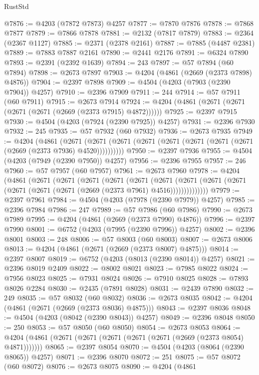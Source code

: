 \begin{lexlean}{RustStd}
\begin{coremodule}
@7876 := @4203 (@7872 @7873) @4257
@7877 := @7870 @7876
@7878 := @7868 @7877
@7879 := @7866 @7878
@7881 := @2132 (@7817 @7879)
@7883 := @2364 (@2367 @1127)
@7885 := @2371 (@2378 @2161)
@7887 := @7885 (@4487 @2381)
@7889 := @7883 @7887 @2161
@7890 := @2441 @2176
@7891 := @6324 @7890
@7893 := @2391 (@2392 @1639)
@7894 := 243
@7897 := @57 @7894 (@60 @7894)
@7898 := @2673 @7897
@7903 := @4204 (@4861 (@2669 (@2373 @7898) @4876))
@7904 := @2397 @7898
@7909 := @4504 (@4203 (@7903 (@2390 @7904)) @4257)
@7910 := @2396 @7909
@7911 := 244
@7914 := @57 @7911 (@60 @7911)
@7915 := @2673 @7914
@7924 := @4204 (@4861 (@2671 (@2671 (@2671 (@2671 (@2669 (@2373 @7915) @4872))))))
@7925 := @2397 @7915
@7930 := @4504 (@4203 (@7924 (@2390 @7925)) @4257)
@7931 := @2396 @7930
@7932 := 245
@7935 := @57 @7932 (@60 @7932)
@7936 := @2673 @7935
@7949 := @4204
    (@4861
      (@2671 (@2671 (@2671 (@2671 (@2671 (@2671 (@2671 (@2671 (@2669 (@2373 @7936) @4520))))))))))
@7950 := @2397 @7936
@7955 := @4504 (@4203 (@7949 (@2390 @7950)) @4257)
@7956 := @2396 @7955
@7957 := 246
@7960 := @57 @7957 (@60 @7957)
@7961 := @2673 @7960
@7978 := @4204
    (@4861
      (@2671
        (@2671
          (@2671
            (@2671
              (@2671
                (@2671
                  (@2671 (@2671 (@2671 (@2671 (@2671 (@2671 (@2669 (@2373 @7961) @4516))))))))))))))
@7979 := @2397 @7961
@7984 := @4504 (@4203 (@7978 (@2390 @7979)) @4257)
@7985 := @2396 @7984
@7986 := 247
@7989 := @57 @7986 (@60 @7986)
@7990 := @2673 @7989
@7995 := @4204 (@4861 (@2669 (@2373 @7990) @4876))
@7996 := @2397 @7990
@8001 := @6752 (@4203 (@7995 (@2390 @7996)) @4257)
@8002 := @2396 @8001
@8003 := 248
@8006 := @57 @8003 (@60 @8003)
@8007 := @2673 @8006
@8013 := @4204 (@4861 (@2671 (@2669 (@2373 @8007) @4875)))
@8014 := @2397 @8007
@8019 := @6752 (@4203 (@8013 (@2390 @8014)) @4257)
@8021 := @2396 @8019 @2409
@8022 := @8002 @8021
@8023 := @7985 @8022
@8024 := @7956 @8023
@8025 := @7931 @8024
@8026 := @7910 @8025
@8028 := @7893 @8026 @2284
@8030 := @2435 (@7891 @8028)
@8031 := @2439 @7890
@8032 := 249
@8035 := @57 @8032 (@60 @8032)
@8036 := @2673 @8035
@8042 := @4204 (@4861 (@2671 (@2669 (@2373 @8036) @4875)))
@8043 := @2397 @8036
@8048 := @4504 (@4203 (@8042 (@2390 @8043)) @4257)
@8049 := @2396 @8048
@8050 := 250
@8053 := @57 @8050 (@60 @8050)
@8054 := @2673 @8053
@8064 := @4204 (@4861 (@2671 (@2671 (@2671 (@2671 (@2671 (@2669 (@2373 @8054) @4871)))))))
@8065 := @2397 @8054
@8070 := @4504 (@4203 (@8064 (@2390 @8065)) @4257)
@8071 := @2396 @8070
@8072 := 251
@8075 := @57 @8072 (@60 @8072)
@8076 := @2673 @8075
@8090 := @4204
    (@4861

\end{coremodule}
\end{lexlean}
